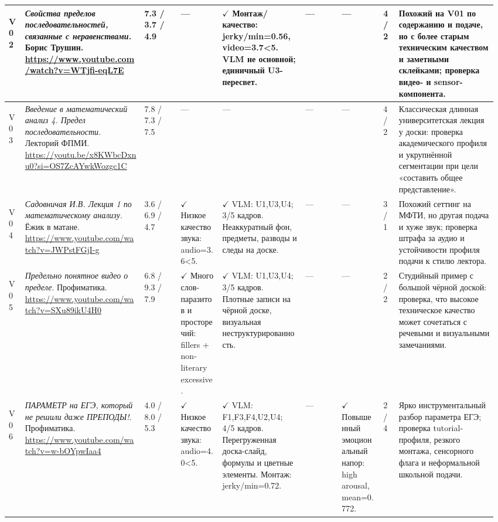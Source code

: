 \begin{landscape}
\begin{longtable}{
L{0.035\linewidth}
L{0.235\linewidth}|
L{0.075\linewidth}|
L{0.085\linewidth}
L{0.160\linewidth}
L{0.070\linewidth}
L{0.085\linewidth}|
L{0.035\linewidth}|
L{0.190\linewidth}
}
\midrule

\hypertarget{vid:v02}{V02} &
\textit{Свойства пределов последовательностей, связанные с неравенствами}. Борис Трушин. {\tiny\url{https://www.youtube.com/watch?v=WTjfi-eqL7E}} &
7.3 / 3.7 / 4.9 &
--- &
$\checkmark$ Монтаж/качество: jerky/min=0.56, video=3.7<5. VLM не основной; единичный U3-пересвет. &
--- &
--- &
4 / 2 &
Похожий на V01 по содержанию и подаче, но с более старым техническим качеством и заметными склейками; проверка видео- и sensor-компонента. \\

\midrule

\hypertarget{vid:v03}{V03} &
\textit{Введение в математический анализ 4. Предел последовательности}. Лекторий ФПМИ. {\tiny\url{https://youtu.be/x8KWbcDxnu0?si=OS7ZcAYwkWozgc1C}} &
7.8 / 7.3 / 7.5 &
--- &
--- &
--- &
--- &
4 / 2 &
Классическая длинная университетская лекция у доски: проверка академического профиля и укрупнённой сегментации при цели «составить общее представление». \\

\midrule

\hypertarget{vid:v04}{V04} &
\textit{Садовничая И.В. Лекция 1 по математическому анализу}. Ёжик в матане. {\tiny\url{https://www.youtube.com/watch?v=JWPstFGjI-g}} &
3.6 / 6.9 / 4.7 &
$\checkmark$ Низкое качество звука: audio=3.6<5. &
$\checkmark$ VLM: U1,U3,U4; 3/5 кадров. Неаккуратный фон, предметы, разводы и следы на доске. &
--- &
--- &
3 / 1 &
Похожий сеттинг на МФТИ, но другая подача и хуже звук; проверка штрафа за аудио и устойчивости профиля подачи к стилю лектора. \\

\midrule

\hypertarget{vid:v05}{V05} &
\textit{Предельно понятное видео о пределе}. Профиматика. {\tiny\url{https://www.youtube.com/watch?v=SXu89ikU4H0}} &
6.8 / 9.3 / 7.9 &
$\checkmark$ Много слов-паразитов и просторечий: fillers + non-literary excessive. &
$\checkmark$ VLM: U1,U3,U4; 3/5 кадров. Плотные записи на чёрной доске, визуальная неструктурированность. &
--- &
--- &
2 / 2 &
Студийный пример с большой чёрной доской: проверка, что высокое техническое качество может сочетаться с речевыми и визуальными замечаниями. \\

\midrule

\hypertarget{vid:v06}{V06} &
\textit{ПАРАМЕТР на ЕГЭ, который не решили даже ПРЕПОДЫ!}. Профиматика. {\tiny\url{https://www.youtube.com/watch?v=w-bOYpwIaa4}} &
4.0 / 8.0 / 5.3 &
$\checkmark$ Низкое качество звука: audio=4.0<5. &
$\checkmark$ VLM: F1,F3,F4,U2,U4; 4/5 кадров. Перегруженная доска-слайд, формулы и цветные элементы. Монтаж: jerky/min=0.72. &
--- &
$\checkmark$ Повышенный эмоциональный напор: high arousal, mean=0.772.&
2 / 4 &
Ярко инструментальный разбор параметра ЕГЭ; проверка tutorial-профиля, резкого монтажа, сенсорного флага и неформальной школьной подачи. \\


\end{longtable}
\end{landscape}
